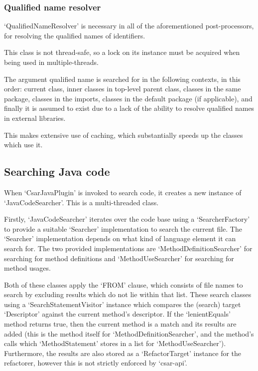 \documentclass[12pt, letterpaper]{article}
\begin{document}
\subsubsection{Qualified name resolver}
`QualifiedNameResolver' is necessary in all of the aforementioned post-processors, for resolving the qualified names of identifiers.

This class is not thread-safe, so a lock on its instance must be acquired when being used in multiple-threads.

The argument qualified name is searched for in the following contexts, in this order: current class, inner classes in top-level parent class, classes in the same package, classes in the imports, classes in the default package (if applicable), and finally it is assumed to exist due to a lack of the ability to resolve qualified names in external libraries.

This makes extensive use of caching, which substantially speeds up the classes which use it.

\subsection{Searching Java code}
When `CsarJavaPlugin' is invoked to search code, it creates a new instance of `JavaCodeSearcher'.
This is a multi-threaded class.

Firstly, `JavaCodeSearcher' iterates over the code base using a `SearcherFactory' to provide a suitable `Searcher' implementation to search the current file.
The `Searcher' implementation depends on what kind of language element it can search for.
The two provided implementations are `MethodDefinitionSearcher' for searching for method definitions and `MethodUseSearcher' for searching for method usages.

Both of these classes apply the `FROM' clause, which consists of file names to search by excluding results which do not lie within that list.
These search classes using a `SearchStatementVisitor' instance which compares the (search) target `Descriptor' against the current method's descriptor.
If the `lenientEquals' method returns true, then the current method is a match and its results are added (this is the method itself for `MethodDefinitionSearcher', and the method's calls which `MethodStatement' stores in a list for `MethodUseSearcher').
Furthermore, the results are also stored as a `RefactorTarget' instance for the refactorer, however this is not strictly enforced by `csar-api'.
\end{document}
